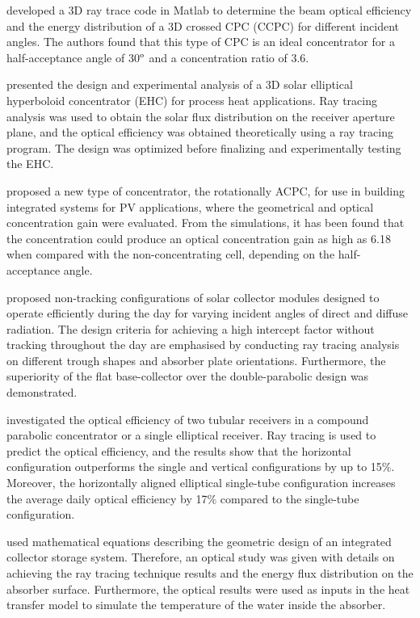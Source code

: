 \citet{Sellami2013} developed a 3D ray trace code in Matlab to determine the beam optical efficiency and the energy distribution of a 3D crossed CPC (CCPC) for different incident angles. The authors found that this type of CPC is an ideal concentrator for a half-acceptance angle of 30$^{\rm{o}}$ and a concentration ratio of 3.6.

\citet{Ali2014} presented the design and experimental analysis of a 3D solar elliptical hyperboloid concentrator (EHC) for process heat applications. Ray tracing analysis was used to obtain the solar flux distribution on the receiver aperture plane, and the optical efficiency was obtained theoretically using a ray tracing program. The design was optimized before finalizing and experimentally testing the EHC.

\citet{Abu-Bakar2014} proposed a new type of concentrator, the rotationally ACPC, for use in building integrated systems for PV applications, where the geometrical and optical concentration gain were evaluated. From the simulations, it has been found that the concentration could produce an optical concentration gain as high as 6.18 when compared with the non-concentrating cell, depending on the half-acceptance angle.

\citet{Ratismith2014} proposed non-tracking configurations of solar collector modules designed to operate efficiently during the day for varying incident angles of direct and diffuse radiation. The design criteria for achieving a high intercept factor without tracking throughout the day are emphasised by conducting ray tracing analysis on different trough shapes and absorber plate orientations. Furthermore, the superiority of the flat base-collector over the double-parabolic design was demonstrated.

\citet{Abdullahi2015} investigated the optical efficiency of two tubular receivers in a compound parabolic concentrator or a single elliptical receiver. Ray tracing is used to predict the optical efficiency, and the results show that the horizontal configuration outperforms the single and vertical configurations by up to 15\%. Moreover, the horizontally aligned elliptical single-tube configuration increases the average daily optical efficiency by 17\% compared to the single-tube configuration.

\citet{Benrejeb2015} used mathematical equations describing the geometric design of an integrated collector storage system. Therefore, an optical study was given with details on achieving the ray tracing technique results and the energy flux distribution on the absorber surface. Furthermore, the optical results were used as inputs in the heat transfer model to simulate the temperature of the water inside the absorber.

